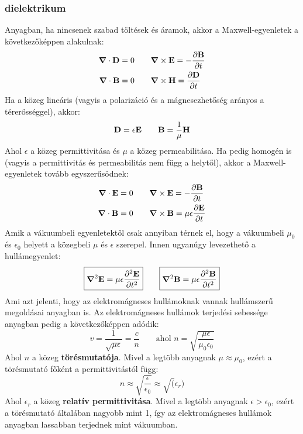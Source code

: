 \documentclass[../main.tex]{subfiles}
\begin{document}
\subsubsection*{dielektrikum}
Anyagban, ha nincsenek szabad töltések és áramok, akkor a Maxwell-egyenletek a következőképpen alakulnak:
\begin{equation}
    \begin{aligned}
        \boldsymbol{\nabla} \cdot \bold{D} &= 0 \qquad \boldsymbol{\nabla} \times \bold{E} = -\frac{\partial \bold{B}}{\partial t} \\
        \boldsymbol{\nabla} \cdot \bold{B} &= 0 \qquad \boldsymbol{\nabla} \times \bold{H} = \frac{\partial \bold{D}}{\partial t} 
    \end{aligned}
\end{equation}
Ha a közeg lineáris (vagyis a polarizáció és a mágnesezhetőség arányos a térerősséggel), akkor:
\begin{equation}
    \bold{D} = \epsilon \bold{E} \qquad \bold{B} = \frac{1}{\mu} \bold{H}
\end{equation}
Ahol $\epsilon$ a közeg permittivitása és $\mu$ a közeg permeabilitása. Ha pedig homogén is (vagyis a permittivitás és permeabilitás nem függ a helytől), akkor a Maxwell-egyenletek tovább egyszerűsödnek:
\begin{equation}
    \begin{aligned}
        \boldsymbol{\nabla} \cdot \bold{E} &= 0 \qquad \boldsymbol{\nabla} \times \bold{E} = -\frac{\partial \bold{B}}{\partial t} \\
        \boldsymbol{\nabla} \cdot \bold{B} &= 0 \qquad \boldsymbol{\nabla} \times \bold{B} = \mu \epsilon \frac{\partial \bold{E}}{\partial t} 
    \end{aligned}
\end{equation}
Amik a vákuumbeli egyenletektől csak annyiban térnek el, hogy a vákuumbeli $\mu_0$ és $\epsilon_0$ helyett a közegbeli $\mu$ és $\epsilon$ szerepel. Innen ugyanúgy levezethető a hullámegyenlet:
\begin{equation}
    \boxed{\boldsymbol{\nabla}^2 \bold{E} = \mu \epsilon \frac{\partial^2 \bold{E}}{\partial t^2}} \qquad \boxed{\boldsymbol{\nabla}^2 \bold{B} = \mu \epsilon \frac{\partial^2 \bold{B}}{\partial t^2}}
\end{equation}
Ami azt jelenti, hogy az elektromágneses hullámoknak vannak hullámszerű megoldásai anyagban is. Az elektromágneses hullámok terjedési sebessége anyagban pedig a következőképpen adódik:
\begin{equation}
    v = \frac{1}{\sqrt{\mu \epsilon}} = \frac{c}{n} \qquad \text{ahol } n = \sqrt{\frac{\mu \epsilon}{\mu_0 \epsilon_0}}
\end{equation}
Ahol $n$ a közeg \textbf{törésmutatója}. Mivel a legtöbb anyagnak $\mu \approx \mu_0$, ezért a törésmutató főként a permittivitástól függ:
\begin{equation}
    n \approx \sqrt{\frac{\epsilon}{\epsilon_0}} \approx \sqrt(\epsilon_r)
\end{equation}
Ahol $\epsilon_r$ a közeg \textbf{relatív permittivitása}. Mivel a legtöbb anyagnak $\epsilon > \epsilon_0$, ezért a törésmutató általában nagyobb mint 1, így az elektromágneses hullámok anyagban lassabban terjednek mint vákuumban.
\end{document}
